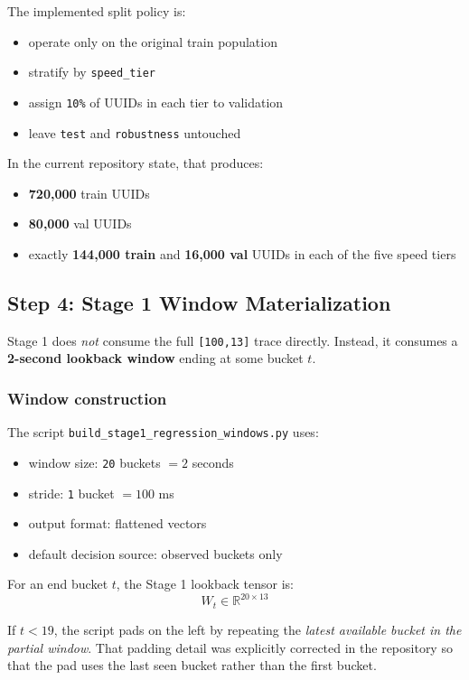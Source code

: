 \documentclass[11pt]{article}
\begin{document}
The implemented split policy is:
\begin{itemize}
\item operate only on the original train population
\item stratify by \texttt{speed\_tier}
\item assign \texttt{10\%} of UUIDs in each tier to validation
\item leave \texttt{test} and \texttt{robustness} untouched
\end{itemize}

In the current repository state, that produces:
\begin{itemize}
\item \textbf{720,000} train UUIDs
\item \textbf{80,000} val UUIDs
\item exactly \textbf{144,000 train} and \textbf{16,000 val} UUIDs in each of the five speed tiers
\end{itemize}

\subsection{Step 4: Stage 1 Window Materialization}

Stage 1 does \emph{not} consume the full \texttt{[100,13]} trace directly. Instead, it consumes a \textbf{2-second lookback window} ending at some bucket \(t\).

\subsubsection*{Window construction}

The script \texttt{build\_stage1\_regression\_windows.py} uses:
\begin{itemize}
\item window size: \texttt{20} buckets \(= 2\) seconds
\item stride: \texttt{1} bucket \(= 100\) ms
\item output format: flattened vectors
\item default decision source: observed buckets only
\end{itemize}

For an end bucket \(t\), the Stage 1 lookback tensor is:
\[
W_t \in \mathbb{R}^{20 \times 13}
\]

If \(t < 19\), the script pads on the left by repeating the \emph{latest available bucket in the partial window}. That padding detail was explicitly corrected in the repository so that the pad uses the last seen bucket rather than the first bucket.
\end{document}
